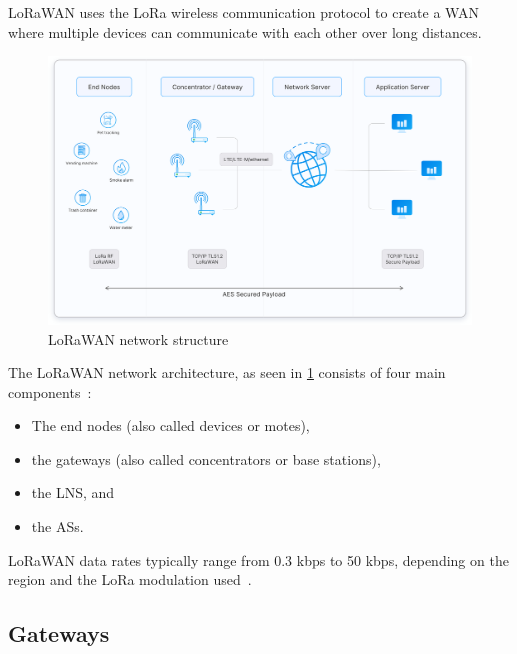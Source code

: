 \ac{LoRaWAN} uses the LoRa wireless communication protocol to create a \ac{WAN} where multiple devices can communicate with each other over long distances.

\begin{figure}
    \centering
    \includegraphics[width=1\textwidth]{pictures/lorawan-structure/lorawan-architecture.png}
    \caption{\ac{LoRaWAN} network structure~\protect\cite{the_things_industries_bv_lorawan_nodate}}\label{pic:lorawan-network-structure}
\end{figure}

The \ac{LoRaWAN} network architecture, as seen in \cref{pic:lorawan-network-structure} consists of four main components~\cite[p. 8]{lora_alliance_inc_lorawan_2017}:

\begin{itemize}
    \item The end nodes (also called devices or motes),
    \item the gateways (also called concentrators or base stations),
    \item the \ac{LNS}, and
    \item the \acp{AS}.
\end{itemize}

\ac{LoRaWAN} data rates typically range from 0.3 kbps to 50 kbps, depending on the region and the \ac{LoRa} modulation used~\cite[p. 8]{lora_alliance_inc_lorawan_2017}.

\subsection{Gateways}

